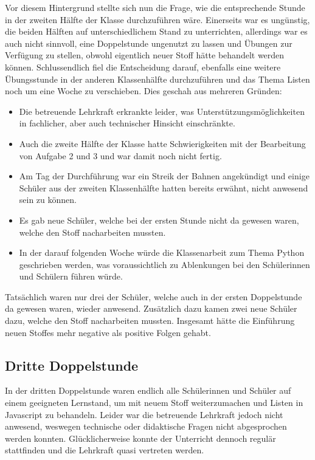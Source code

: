 Vor diesem Hintergrund stellte sich nun die Frage, wie die entsprechende Stunde in der zweiten Hälfte der Klasse durchzuführen wäre.
Einerseits war es ungünstig, die beiden Hälften auf unterschiedlichem Stand zu unterrichten, allerdings war es auch nicht sinnvoll, eine Doppelstunde ungenutzt zu lassen und Übungen zur Verfügung zu stellen, obwohl eigentlich neuer Stoff hätte behandelt werden können.
Schlussendlich fiel die Entscheidung darauf, ebenfalls eine weitere Übungsstunde in der anderen Klassenhälfte durchzuführen und das Thema Listen noch um eine Woche zu verschieben.
Dies geschah aus mehreren Gründen:
\begin{itemize}
	\item Die betreuende Lehrkraft erkrankte leider, was Unterstützungsmöglichkeiten in fachlicher, aber auch technischer Hinsicht einschränkte.
	\item Auch die zweite Hälfte der Klasse hatte Schwierigkeiten mit der Bearbeitung von Aufgabe 2 und 3 und war damit noch nicht fertig.
	\item Am Tag der Durchführung war ein Streik der Bahnen angekündigt und einige Schüler aus der zweiten Klassenhälfte hatten bereits erwähnt, nicht anwesend sein zu können.
	\item Es gab neue Schüler, welche bei der ersten Stunde nicht da gewesen waren, welche den Stoff nacharbeiten mussten.
	\item In der darauf folgenden Woche würde die Klassenarbeit zum Thema Python geschrieben werden, was voraussichtlich zu Ablenkungen bei den Schülerinnen und Schülern führen würde.
\end{itemize}
Tatsächlich waren nur drei der Schüler, welche auch in der ersten Doppelstunde da gewesen waren, wieder anwesend.
Zusätzlich dazu kamen zwei neue Schüler dazu, welche den Stoff nacharbeiten mussten.
Insgesamt hätte die Einführung neuen Stoffes mehr negative als positive Folgen gehabt.


\subsection{Dritte Doppelstunde}
\label{subsec:doppelstunde-3}

In der dritten Doppelstunde waren endlich alle Schülerinnen und Schüler auf einem geeigneten Lernstand, um mit neuem Stoff weiterzumachen und Listen in Javascript zu behandeln.
Leider war die betreuende Lehrkraft jedoch nicht anwesend, weswegen technische oder didaktische Fragen nicht abgesprochen werden konnten.
Glücklicherweise konnte der Unterricht dennoch regulär stattfinden und die Lehrkraft quasi vertreten werden.

